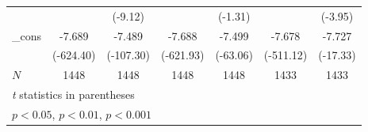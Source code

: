 {\begin{tabular}{l*{6}{c}}
            &                     &     (-9.12)         &                     &     (-1.31)         &                     &     (-3.95)         \\
[1em]
\_cons      &      -7.689\sym{***}&      -7.489\sym{***}&      -7.688\sym{***}&      -7.499\sym{***}&      -7.678\sym{***}&      -7.727\sym{***}\\
            &   (-624.40)         &   (-107.30)         &   (-621.93)         &    (-63.06)         &   (-511.12)         &    (-17.33)         \\
\hline
\(N\)       &        1448         &        1448         &        1448         &        1448         &        1433         &        1433         \\
\hline\hline
\multicolumn{7}{l}{\footnotesize \textit{t} statistics in parentheses}\\
\multicolumn{7}{l}{\footnotesize \sym{*} \(p<0.05\), \sym{**} \(p<0.01\), \sym{***} \(p<0.001\)}\\
\end{tabular}
}
